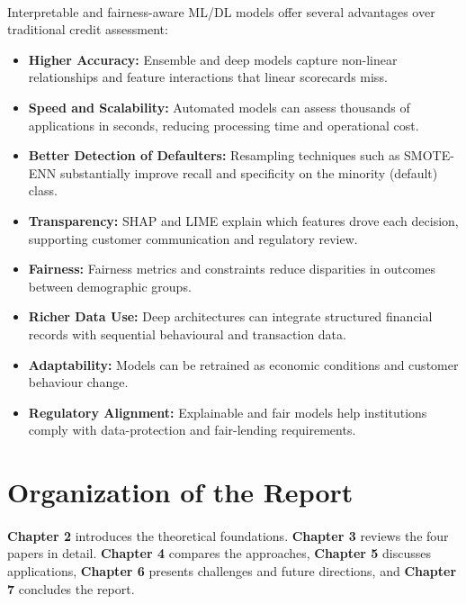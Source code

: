 \documentclass[12pt,a4paper,final]{extreport}
\begin{document}
\paragraph{} Interpretable and fairness-aware ML/DL models offer several advantages over traditional credit assessment:
\begin{itemize}
  \item \textbf{Higher Accuracy:} Ensemble and deep models capture non-linear relationships and feature interactions that linear scorecards miss.
  \item \textbf{Speed and Scalability:} Automated models can assess thousands of applications in seconds, reducing processing time and operational cost.
  \item \textbf{Better Detection of Defaulters:} Resampling techniques such as SMOTE-ENN substantially improve recall and specificity on the minority (default) class.
  \item \textbf{Transparency:} SHAP and LIME explain which features drove each decision, supporting customer communication and regulatory review.
  \item \textbf{Fairness:} Fairness metrics and constraints reduce disparities in outcomes between demographic groups.
  \item \textbf{Richer Data Use:} Deep architectures can integrate structured financial records with sequential behavioural and transaction data.
  \item \textbf{Adaptability:} Models can be retrained as economic conditions and customer behaviour change.
  \item \textbf{Regulatory Alignment:} Explainable and fair models help institutions comply with data-protection and fair-lending requirements.
\end{itemize}

\section{Organization of the Report}

\paragraph{} \textbf{Chapter 2} introduces the theoretical foundations. \textbf{Chapter 3} reviews the four papers in detail. \textbf{Chapter 4} compares the approaches, \textbf{Chapter 5} discusses applications, \textbf{Chapter 6} presents challenges and future directions, and \textbf{Chapter 7} concludes the report.
\end{document}
